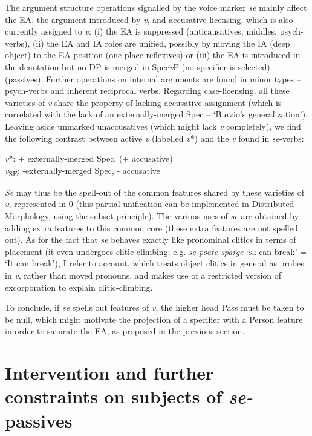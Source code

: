 \documentclass[output=paper]{langsci/langscibook}
\begin{document}
The argument structure operations signalled by the voice marker \textit{se} mainly affect the EA, the argument introduced by \textit{v}, and accusative licensing, which is also currently assigned to \textit{v}: (i) the EA is suppressed (anticausatives, middles, psych-verbs), (ii) the EA and IA roles are unified, possibly by moving the IA (deep object) to the EA position (one-place reflexives) or (iii) the EA is introduced in the denotation but no DP is merged in Spec\textit{v}P (no specifier is selected) (passives). Further operations on internal arguments are found in minor types – psych-verbs and inherent reciprocal verbs. Regarding case-licensing, all these varieties of \textit{v} share the property of lacking accusative assignment (which is correlated with the lack of an externally-merged Spec – ‘Burzio’s generalization’). Leaving aside unmarked unaccusatives (which might lack \textit{v} completely), we find the following contrast between active \textit{v} (labelled \textit{v}*) and the \textit{v} found in \textit{se}{}-verbs: 

\ea%
\label{ex:giurgea:61}
\label{bkm:Ref449274243}
\textit{v}*: + externally-merged Spec, (+ accusative)\\
\textit{v}\textsubscript{SE}: -externally-merged Spec, - accusative  
\z

\textit{Se} may thus be the spell-out of the common features shared by these varieties of \textit{v}, represented in 0 (this partial unification can be implemented in Distributed Morphology, using the subset principle). The various uses of \textit{se} are obtained by adding extra features to this common core (these extra features are not spelled out). As for the fact that \textit{se} behaves exactly like pronominal clitics in terms of placement (it even undergoes clitic-climbing; e.g. \textit{se poate sparge} ‘\textsc{se} can break’ = ‘It can break’), I refer to  account, which treats object clitics in general as probes in \textit{v}, rather than moved pronouns, and makes use of a restricted version of excorporation to explain clitic-climbing.

  To conclude, if \textit{se} spells out features of \textit{v}, the higher head Pass must be taken to be null, which might motivate the projection of a specifier with a Person feature in order to saturate the EA, as proposed in the previous section.

\section{Intervention and further constraints on subjects of \textit{se-}passives}%
\end{document}
